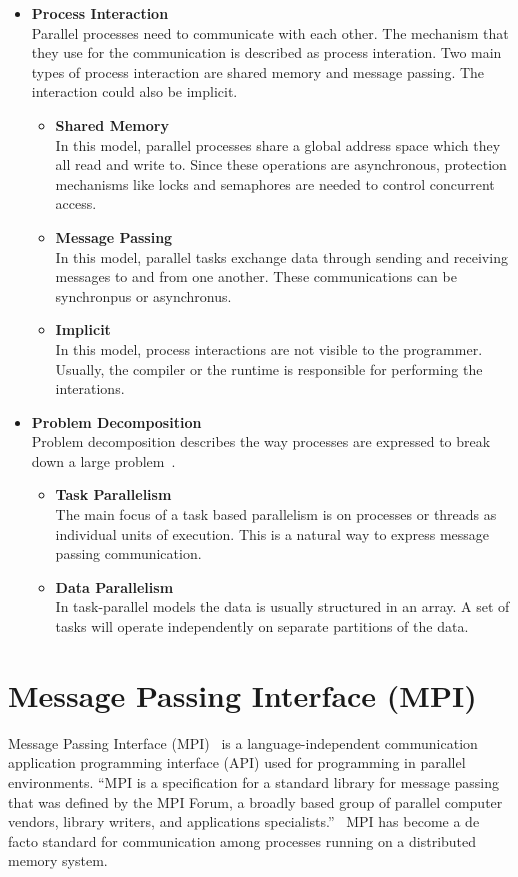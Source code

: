 \begin{itemize}
\item \textbf{Process Interaction}\\
  Parallel processes need to communicate with each other. The mechanism that they use for the communication is described as process interation. Two main types of process interaction are shared memory and message passing. The interaction could also be implicit.
  \begin{itemize}
  \item \textbf{Shared Memory}\\
    In this model, parallel processes share a global address space which they all read and write to. Since these operations are asynchronous, protection mechanisms like locks and semaphores are needed to control concurrent access.
  \item \textbf{Message Passing}\\
    In this model, parallel tasks exchange data through sending and receiving messages to and from one another. These communications can be synchronpus or asynchronus.
  \item \textbf{Implicit}\\
    In this model, process interactions are not visible to the programmer. Usually, the compiler or the runtime is responsible for performing the interations.
  \end{itemize}
\item \textbf{Problem Decomposition}\\
Problem decomposition describes the way processes are expressed to break down a large problem~\cite{Quinn:2003:PPC:1211440}.
  \begin{itemize}
  \item \textbf{Task Parallelism}\\
    The main focus of a task based parallelism is on processes or threads as individual units of execution. This is a natural way to express message passing communication.
  \item \textbf{Data Parallelism}\\
    In task-parallel models the data is usually structured in an array. A set of tasks will operate independently on separate partitions of the data.     
  \end{itemize}
\end{itemize}


\section{Message Passing Interface (MPI)}
Message Passing Interface (MPI)~\cite{mpi} is a language-independent communication application programming interface (API) used for programming in parallel environments. ``MPI is a specification for a standard library for message passing that was defined by the MPI Forum, a broadly based group of parallel computer vendors, library writers, and applications specialists.''~\cite{gropp1996high} MPI has become a de facto standard for communication among processes running on a distributed memory system.

